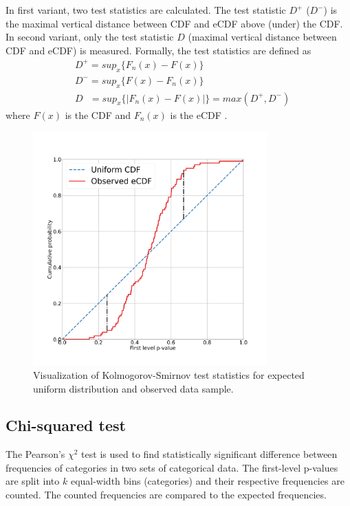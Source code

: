\documentclass[
  digital,     %
  oneside,     %
  nosansbold,  %
  nocolorbold, %
  nolof,         %
  nolot,         %
]{fithesis4}
\begin{document}
In first variant, two test statistics are calculated. The test statistic $D^+$ ($D^-$) is the maximal vertical distance between CDF and eCDF above (under) the CDF. In second variant, only the test statistic $D$ (maximal vertical distance between CDF and eCDF) is measured. Formally, the test statistics are defined as
\[\begin{split}
    &D^+ = sup_x\{F_n(x) - F(x)\}\\
    &D^- = sup_x\{F(x) - F_n(x)\}\\
    &D \:\:\:= sup_x\{|F_n(x) - F(x)|\} = max(D^+, D^-)
\end{split}
\] where $F(x)$ is the CDF and $F_n(x)$ is the  eCDF \cite[p. 100]{GOF-techniques}.


\begin{figure}
  \begin{center}
    \includegraphics[width=9cm]{figures/ks_d.png}
  \end{center}
  \caption{Visualization of Kolmogorov-Smirnov test statistics for expected uniform distribution and observed data sample.}
  \label{fig:ks_d}
\end{figure}

\subsection{Chi-squared test}

The Pearson's $\chi^2$ test is used to find statistically significant difference between frequencies of categories in two sets of categorical data. The first-level p-values are split into $k$ equal-width bins (categories) and their respective frequencies are counted. The counted frequencies are compared to the expected frequencies.
\end{document}
